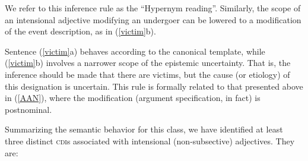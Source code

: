 \documentclass[10pt]{article}
\begin{document}
\noindent We refer to this inference rule as the ``Hypernym reading''. 
Similarly, the scope of an intensional adjective modifying an undergoer can be lowered to a modification of the event description, as  in (\ref{victim}b). 

\vspace{-0.5em}
\vspace{-0.5em}


\noindent Sentence  (\ref{victim}a) behaves according to the canonical template, while  (\ref{victim}b) involves a narrower scope of the epistemic uncertainty. That is, the inference should be made that there are victims, but the cause (or etiology) of this designation is uncertain. This rule is formally related to that presented above in (\ref{AAN}), where the modification (argument specification, in fact) is postnominal. 

\vspace{-0.5em}
\vspace{-0.5em}


\noindent Summarizing the semantic behavior for this class, we have identified at least three distinct \textsc{cdi}s associated with intensional (non-subsective) adjectives. They are:

\vspace{-0.5em}

\end{document}
